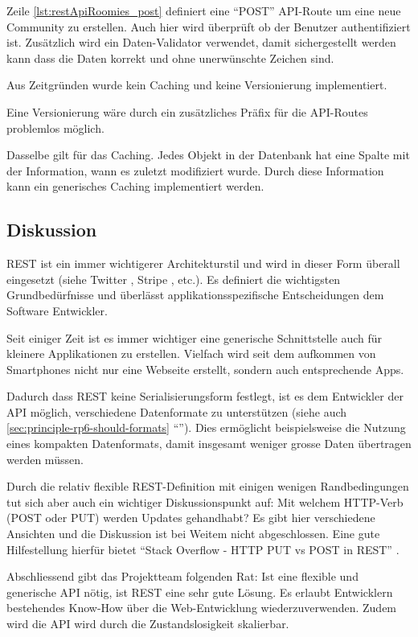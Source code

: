 Zeile \autoref{lst:restApiRoomies_post} definiert eine ``POST'' API-Route um eine neue Community zu erstellen. Auch hier wird überprüft ob der Benutzer authentifiziert ist. Zusätzlich wird ein Daten-Validator verwendet, damit sichergestellt werden kann dass die Daten korrekt und ohne unerwünschte Zeichen sind.

Aus Zeitgründen wurde kein Caching und keine Versionierung implementiert.

Eine Versionierung wäre durch ein zusätzliches Präfix für die API-Routes problemlos möglich.

Dasselbe gilt für das Caching. Jedes Objekt in der Datenbank hat eine Spalte mit der Information, wann es zuletzt modifiziert wurde. Durch diese Information kann ein generisches Caching implementiert werden.

\subsection*{Diskussion}

\gls{REST} ist ein immer wichtigerer Architekturstil und wird in dieser Form überall eingesetzt (siehe Twitter \cite{TwitterAPI}, Stripe \cite{StripeAPI}, etc.). Es definiert die wichtigsten Grundbedürfnisse und überlässt applikationsspezifische Entscheidungen dem Software Entwickler.

Seit einiger Zeit ist es immer wichtiger eine generische Schnittstelle auch für kleinere Applikationen zu erstellen. Vielfach wird seit dem aufkommen von Smartphones nicht nur eine Webseite erstellt, sondern auch entsprechende Apps.

Dadurch dass \gls{REST} keine Serialisierungsform festlegt, ist es dem Entwickler der API möglich, verschiedene Datenformate zu unterstützen (siehe auch \ref{sec:principle-rp6-should-formats} ``''). Dies ermöglicht beispielsweise die Nutzung eines kompakten Datenformats, damit insgesamt weniger grosse Daten übertragen werden müssen.

Durch die relativ flexible REST-Definition mit einigen wenigen Randbedingungen tut sich aber auch ein wichtiger Diskussionspunkt auf: Mit welchem HTTP-Verb (POST oder PUT) werden Updates gehandhabt? Es gibt hier verschiedene Ansichten und die Diskussion ist bei Weitem nicht abgeschlossen. Eine gute Hilfestellung hierfür bietet ``Stack Overflow - HTTP PUT vs POST in REST'' \cite{StackoverflowPUTvsPOST}.

Abschliessend gibt das Projektteam folgenden Rat: Ist eine flexible und generische API nötig, ist \gls{REST} eine sehr gute Lösung. Es erlaubt Entwicklern bestehendes Know-How über die Web-Entwicklung wiederzuverwenden. Zudem wird die API wird durch die Zustandslosigkeit skalierbar.